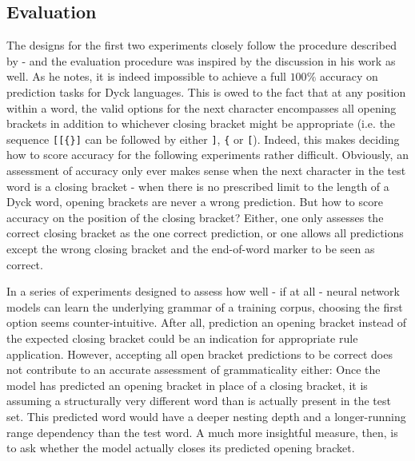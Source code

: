 \subsection{Evaluation}\label{evaluation}
The designs for the first two experiments closely follow the procedure described by \cite{Bernardy2018} - and the evaluation procedure was inspired by the discussion in his work as well. As he notes, it is indeed impossible to achieve a full $100\%$ accuracy on prediction tasks for Dyck languages. This is owed to the fact that at any position within a word, the valid options for the next character encompasses all opening brackets in addition to whichever closing bracket might be appropriate (i.e. the sequence \texttt{[[\{\}]} can be followed by either \texttt{]}, \texttt{\{} or \texttt{[}). Indeed, this makes deciding how to score accuracy for the following experiments rather difficult. Obviously, an assessment of accuracy only ever makes sense when the next character in the test word is a closing bracket - when there is no prescribed limit to the length of a Dyck word, opening brackets are never a wrong prediction. But how to score accuracy on the position of the closing bracket? Either, one only assesses the correct closing bracket as the one correct prediction, or one allows all predictions except the wrong closing bracket and the end-of-word marker to be seen as correct.

In a series of experiments designed to assess how well - if at all - neural network models can learn the underlying grammar of a training corpus, choosing the first option seems counter-intuitive. After all, prediction an opening bracket instead of the expected closing bracket could be an indication for appropriate rule application. However, accepting all open bracket predictions to be correct does not contribute to an accurate assessment of grammaticality either: Once the model has predicted an opening bracket in place of a closing bracket, it is assuming a structurally very different word than is actually present in the test set. This predicted word would have a deeper nesting depth and a longer-running range dependency than the test word. A much more insightful measure, then, is to ask whether the model actually closes its predicted opening bracket.

